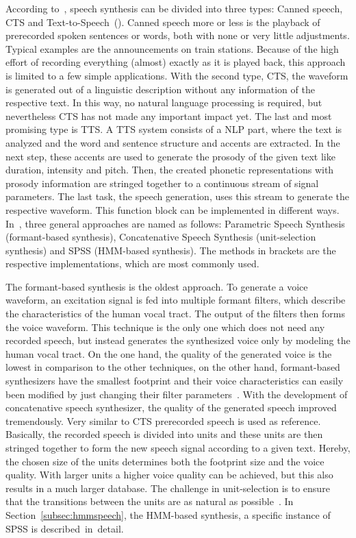 According to~\cite{hinterleitner:quality}, speech synthesis can be divided into three types: Canned speech, \ac{CTS} and Text-to-\break Speech~(). Canned speech more or less is the playback of prerecorded spoken sentences or words, both with none or very little adjustments. Typical examples are the announcements on train stations. Because of the high effort of recording everything (almost) exactly as it is played back, this approach is limited to a few simple applications. With the second type, \ac{CTS}, the waveform is generated out of a linguistic description without any information of the respective text. In this way, no natural language processing is required, but nevertheless \ac{CTS} has not made any important impact yet. The last and most promising type is \ac{TTS}. A \ac{TTS} system consists of a \ac{NLP} part, where the text is analyzed and the word and sentence structure and accents are extracted. In the next step, these accents are used to generate the prosody of the given text like duration, intensity and pitch. Then, the created phonetic representations with prosody information are stringed together to a continuous stream of signal parameters. The last task, the speech generation, uses this stream to generate the respective waveform. This function block can be implemented in different ways. In~\cite{hinterleitner:quality}, three general approaches are named as follows: Parametric Speech Synthesis (formant-based synthesis), Concatenative Speech Synthesis (unit-selection synthesis) and \acf{SPSS} (\acf{HMM}-based synthesis). The methods in brackets are the respective implementations, which are most commonly used. 

The formant-based synthesis is the oldest approach. To generate a voice waveform, an excitation signal is fed into multiple formant filters, which describe the characteristics of the human vocal tract. The output of the filters then forms the voice waveform. This technique is the only one which does not need any recorded speech, but instead generates the synthesized voice only by modeling the human vocal tract. On the one hand, the quality of the generated voice is the lowest in comparison to the other techniques, on the other hand, formant-based synthesizers have the smallest footprint and their voice characteristics can easily been modified by just changing their filter parameters~\cite{hinterleitner:quality}.
With the development of concatenative speech synthesizer, the quality of the generated speech improved tremendously. Very similar to \ac{CTS} prerecorded speech is used as reference. Basically, the recorded speech is divided into units and these units are then stringed together to form the new speech signal according to a given text. Hereby, the chosen size of the units determines both the footprint size and the voice quality. With larger units a higher voice quality can be achieved, but this also results in a much larger database. The challenge in unit-selection is to ensure that the transitions between the units are as natural as possible~\cite{hinterleitner:quality}. In Section~\ref{subsec:hmmspeech}, the \ac{HMM}-based synthesis, a specific instance of \ac{SPSS} is described~in~detail.

